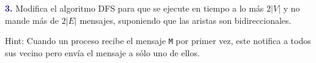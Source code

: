 \newpage
\textbf{\textcolor{MidnightBlue}{3.}}
Modifica el algoritmo DFS para que se ejecute en tiempo a lo más $2|V|$ y no mande más de $2|E|$ mensajes, suponiendo que las aristas son bidireccionales. 

Hint: Cuando un proceso recibe el mensaje {\tt M} por primer vez, este notifica a todos sus vecino pero envía el mensaje a sólo uno de ellos.

